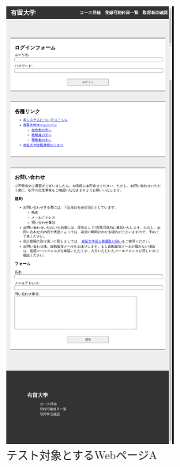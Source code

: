 \begin{figure}[htbp]
    \centering
    \includegraphics[width=0.5\textwidth]{image/5/original_png/bf_original.png}
    \caption{テスト対象とするWebページA}
    \label{fig:bf_original}
\end{figure}

